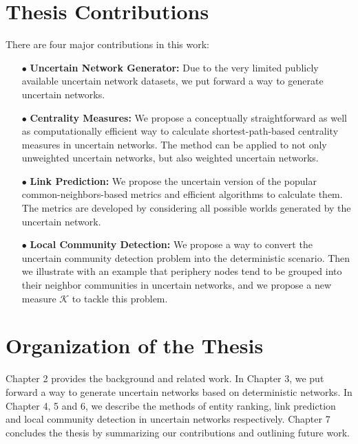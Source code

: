 \documentclass[\main/thesis.tex]{subfiles}
\begin{document}
\section{Thesis Contributions}
There are four major contributions in this work:
\begin{enumerate}
\item[$\bullet$] \textbf{Uncertain Network Generator:}  Due to the very limited publicly available uncertain network datasets, we put forward a way to generate uncertain networks.
\item[$\bullet$] \textbf{Centrality Measures:}  We propose a conceptually straightforward as well as computationally efficient way to calculate shortest-path-based centrality measures in uncertain networks. The method can be applied to not only unweighted uncertain networks, but also weighted uncertain networks.
\item[$\bullet$] \textbf{Link Prediction:}  We propose the uncertain version of the popular common-neighbors-based metrics and efficient algorithms to calculate them. The metrics are developed by considering all possible worlds generated by the uncertain network.
\item[$\bullet$] \textbf{Local Community Detection:} We propose a way to convert the uncertain community detection problem into the deterministic scenario. Then we illustrate with an example that periphery nodes tend to be grouped into their neighbor communities in uncertain networks, and we propose a new measure $\mathcal{K}$ to tackle this problem.

\end{enumerate}

\newpage

\section{Organization of the Thesis}

Chapter 2 provides the background and related work. In Chapter 3, we put forward a way to generate uncertain networks based on deterministic networks. In Chapter 4, 5 and 6, we describe the methods of entity ranking, link prediction and local community detection in uncertain networks respectively. Chapter 7 concludes the thesis by summarizing our contributions and outlining future work.
\end{document}
